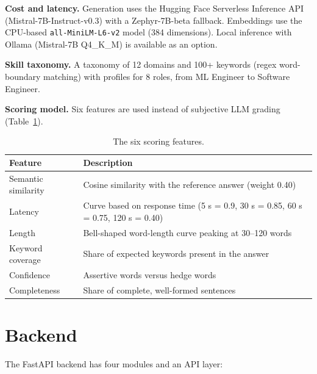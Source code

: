 \documentclass[11pt,a4paper]{report}
\begin{document}
\textbf{Cost and latency.} Generation uses the Hugging Face Serverless Inference API (Mistral-7B-Instruct-v0.3) with a Zephyr-7B-beta fallback. Embeddings use the CPU-based \texttt{all-MiniLM-L6-v2} model (384 dimensions). Local inference with Ollama (Mistral-7B Q4\_K\_M) is available as an option.

\textbf{Skill taxonomy.} A taxonomy of 12 domains and 100+ keywords (regex word-boundary matching) with profiles for 8 roles, from ML Engineer to Software Engineer.

\textbf{Scoring model.} Six features are used instead of subjective LLM grading (Table~\ref{tab:features}).

\begin{table}[H]
\centering
\begin{tabularx}{\textwidth}{lX}
\toprule
\textbf{Feature} & \textbf{Description}\\
\midrule
Semantic similarity & Cosine similarity with the reference answer (weight 0.40)\\
Latency & Curve based on response time (5 s = 0.9, 30 s = 0.85, 60 s = 0.75, 120 s = 0.40)\\
Length & Bell-shaped word-length curve peaking at 30--120 words\\
Keyword coverage & Share of expected keywords present in the answer\\
Confidence & Assertive words versus hedge words\\
Completeness & Share of complete, well-formed sentences\\
\bottomrule
\end{tabularx}
\caption{The six scoring features.}
\label{tab:features}
\end{table}

\section{Backend}

The FastAPI backend has four modules and an API layer:
\end{document}
